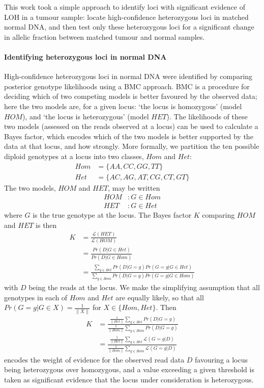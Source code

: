 \documentclass[thesis.tex]{subfiles}
\begin{document}
This work took a simple approach to identify loci with significant evidence of \gls{LOH} in a tumour sample: locate high-confidence heterozygous loci in matched normal DNA, and then test only these heterozygous loci for a significant change in allelic fraction between matched tumour and normal samples.

\paragraph{Identifying heterozygous loci in normal DNA}

High-confidence heterozygous loci in normal DNA were identified by comparing posterior genotype likelihoods using a \gls{BMC} approach.  \gls{BMC} is a procedure for deciding which of two competing models is better favoured by the observed data; here the two models are, for a given locus: `the locus is homozygous' (model $HOM$), and `the locus is heterozygous' (model $HET$).  The likelihoods of these two models (assessed on the reads observed at a locus) can be used to calculate a Bayes factor, which encodes which of the two models is better supported by the data at that locus, and how strongly.  More formally, we partition the ten possible diploid genotypes at a locus into two classes, $Hom$ and $Het$:
\begin{align}
Hom &= \{AA, CC, GG, TT\} \\
Het &= \{AC, AG, AT, CG, CT, GT\}
\label{eq:comm_het_genotypes}
\end{align}
The two models, $HOM$ and $HET$, may be written
\begin{align}
HOM &: G \in Hom \\
HET &: G \in Het
\label{eq:comm_het_genotypes}
\end{align}
where $G$ is the true genotype at the locus.  The Bayes factor $K$ comparing $HOM$ and $HET$ is then
\begin{align}
K &= \frac{\mathcal{L}(HET)}{\mathcal{L}(HOM)} \\
  &= \frac{Pr(D|G \in Het)}{Pr(D|G \in Hom)} \\
  &= \frac{\sum_{g \in Het} Pr(D|G = g)Pr(G = g|G \in Het) }{\sum_{g \in Hom} Pr(D|G = g)Pr(G = g|G \in Hom) }
\label{eq:comm_het_bayes}
\end{align}
with $D$ being the reads at the locus.  We make the simplifying assumption that all genotypes in each of $Hom$ and $Het$ are equally likely, so that all $Pr(G = g|G \in X) = \frac{1}{\|X\|}$ for $X \in \{Hom, Het\}$.  Then
\begin{align}
K &= \frac{\frac{1}{\|Het\|}\sum_{g \in Het} Pr(D|G = g)}{\frac{1}{\|Hom\|}\sum_{g \in Hom} Pr(D|G = g)} \\
  &= \frac{\frac{1}{\|Het\|}\sum_{g \in Het} \mathcal{L}(G = g|D)}{\frac{1}{\|Hom\|}\sum_{g \in Hom} \mathcal{L}(G = g|D)}
\end{align} 
encodes the weight of evidence for the observed read data $D$ favouring a locus being heterozygous over homozygous, and a value exceeding a given threshold is taken as significant evidence that the locus under consideration is heterozygous.
\end{document}
